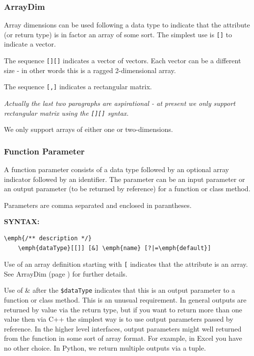 \subsubsection{ArrayDim} \label{arrayDim}

Array dimensions can be used following a data type to indicate that the attribute (or return type) is in factor an array of some sort.
The simplest use is \texttt{[]} to indicate a vector.

The sequence \texttt{[][]} indicates a vector of vectors.
Each vector can be a different size - in other words this is a ragged 2-dimensional array.

The sequence \texttt{[,]} indicates a rectangular matrix.

\textit{Actually the last two paragraphs are aspirational - at present we only support rectangular matrix using the \texttt{[][]} syntax.}

We only support arrays of either one or two-dimensions.
\subsubsection{Function Parameter} \label{functionParam}

A function parameter consists of a data type followed by an optional array indicator followed by an identifier. The parameter can be an input parameter or an output parameter (to be returned by reference) for a function or class method.

Parameters are comma separated and enclosed in parantheses.


\textbf{SYNTAX:}
\nopagebreak
\begin{Verbatim}[commandchars=\\\{\}]
    \emph{/** description */}
    \emph{dataType}[[]] [&] \emph{name} [?|=\emph{default}]
\end{Verbatim}

Use of an array definition starting with \texttt{[} indicates that the attribute is an array.
See ArrayDim (page \pageref{arrayDim}) for further details.

Use of \& after the \texttt{\$dataType} indicates that this is an output parameter to a function or class method. This is an unusual requirement. In general outputs are returned by value via the return type, but if you want to return more than one value then via C++ the simplest way is to use output parameters passed by reference. In the higher level interfaces, output parameters might well returned from the function in some sort of array format. For example, in Excel you have no other choice. In Python, we return multiple outputs via a tuple.

